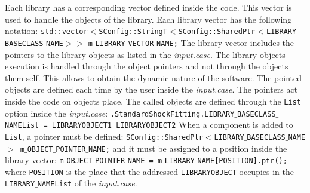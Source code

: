 \documentclass[11pt,a4paper,oneside]{article}
\begin{document}
Each library has a corresponding vector defined inside the code. This vector is used to handle the objects of the library. Each library vector has the following notation:
\newline
\newline
\hspace*{0.8cm}
\texttt{\footnotesize{std::vector$<$SConfig::StringT$<$SConfig::SharedPtr$<$LIBRARY$\_$BASECLASS$\_$NAME$>>$}}
\newline
\hspace*{9cm}\texttt{\footnotesize{m$\_$LIBRARY$\_$VECTOR$\_$NAME;}}
\newline
\newline
The library vector includes the pointers to the library objects as listed in the \textit{input.case}. The library objects execution is handled through the object pointers and not through the objects them self.
This allows to obtain the dynamic nature of the software. The pointed objects are defined each time by the user inside the \textit{input.case}. The pointers act inside the code on objects place.
\newline
The called objects are defined through the \texttt{List} option inside the \textit{input.case}:
\newline
\newline
\hspace*{0.08cm}
\texttt{.StandardShockFitting.LIBRARY$\_$BASECLASS$\_$NAMEList = LIBRARYOBJECT1 LIBRARYOBJECT2}
\newline
\newline
When a component is added to \texttt{List}, a pointer must be defined:
\newline
\newline
\hspace*{0.08cm}
\texttt{SConfig::SharedPtr$<$LIBRARY$\_$BASECLASS$\_$NAME$>$ m$\_$OBJECT$\_$POINTER$\_$NAME;}
\newline
\newline
and it must be assigned to a position inside the library vector:
\newline
\newline
\hspace*{0.08cm}
\texttt{m$\_$OBJECT$\_$POINTER$\_$NAME = m$\_$LIBRARY$\_$NAME[POSITION].ptr();}
\newline
\newline
where \texttt{POSITION} is the place that the addressed \texttt{LIBRARYOBJECT} occupies in the \texttt{LIBRARY$\_$NAMEList} of the \textit{input.case}.
\newline
\end{document}
